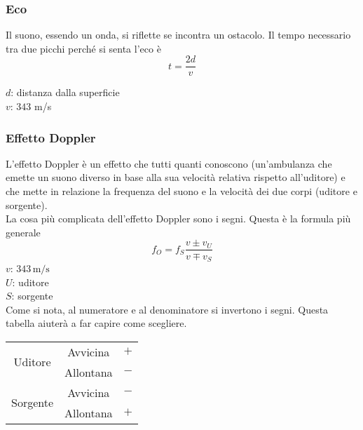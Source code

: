 \subsubsection{Eco}
Il suono, essendo un onda, si riflette se incontra un ostacolo. Il tempo necessario tra due picchi
perché si senta l'eco è
\begin{equation*}
  t = \frac{2d}{v}
\end{equation*}
\begin{center}
\end{center}
$d$: distanza dalla superficie\\
\hyperref[tab:vs]{$v$}: $343$ m/s

\subsubsection{Effetto Doppler}
L'effetto Doppler è un effetto che tutti quanti conoscono (un'ambulanza che emette un 
suono diverso in base alla sua velocità relativa rispetto all'uditore) e che mette in relazione la 
frequenza del suono e la velocità dei due corpi (uditore e sorgente).\\

La cosa più complicata dell'effetto Doppler sono i segni. Questa è la formula più generale
\begin{equation*}
f_O = f_S\frac{v\pm v_U}{v\mp v_S}
\end{equation*}
\hyperref[tab:vs]{$v$}: $343\,\text{m/s}$\\
$U$: uditore\\
$S$: sorgente\\

Come si nota, al numeratore e al denominatore si invertono i segni. Questa tabella aiuterà a far 
capire come scegliere.

\begin{center}
	\begin{tabular}{| c | c | c |}
		\hline
		\multicolumn{1}{|c}{\multirow{2}{*}{Uditore}} & 
			\multicolumn{1}{|c|}{Avvicina} & $+$\\ \cline{2-3}
		\multicolumn{1}{|c}{} &
			\multicolumn{1}{|c|}{Allontana} & $-$\\ 
		\hline\hline
		\multicolumn{1}{|c}{\multirow{2}{*}{Sorgente}} & 
			\multicolumn{1}{|c|}{Avvicina} & $-$\\ \cline{2-3}
		\multicolumn{1}{|c}{} &
			\multicolumn{1}{|c|}{Allontana} & $+$\\
		\hline 
	\end{tabular}
\end{center}

